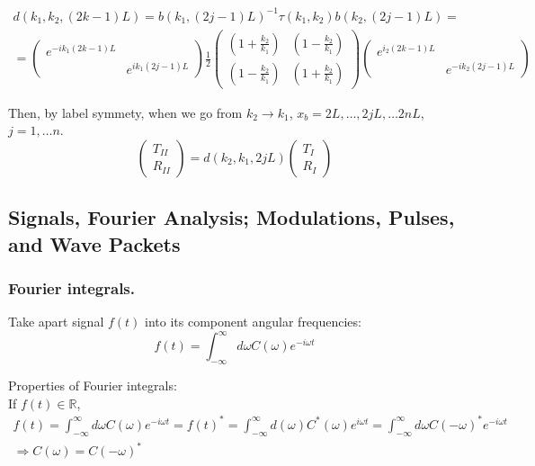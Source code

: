 \documentclass[twoside, 10pt]{amsart}
\begin{document}
\[
\begin{gathered}
  d(k_1,k_2,(2k-1)L) = b(k_1,(2j-1)L)^{-1} \tau(k_1,k_2) b(k_2,(2j-1)L ) = \\
  = \left( \begin{matrix} e^{-ik_1 (2k-1) L } & \\ & e^{ik_1(2j-1) L } \end{matrix} \right) \frac{1}{2} \left( \begin{matrix} \left( 1 + \frac{k_2}{k_1} \right) & \left( 1 - \frac{k_2}{k_1} \right) \\ \left( 1 - \frac{k_2}{k_1} \right) & \left( 1 + \frac{k_2}{k_1} \right) \end{matrix} \right) \left( \begin{matrix} e^{i_2 ( 2k-1) L } & \\ & e^{-ik_2(2j-1) L } \end{matrix} \right)
\end{gathered}
\]

Then, by label symmety, when we go from $k_2 \to k_1$, $x_b = 2L, \dots, 2jL, \dots 2nL$, $j=1,\dots n$.  
\[
\left( \begin{matrix} T_{II} \\ R_{II} \end{matrix} \right)  = d(k_2,k_1, 2jL ) \left( \begin{matrix} T_I \\ R_I \end{matrix} \right)
\]



\subsection{Signals, Fourier Analysis; Modulations, Pulses, and Wave Packets }

\subsubsection{Fourier integrals.}  

Take apart signal $f(t)$ into its component angular frequencies:
\[
f(t) = \int_{-\infty}^{\infty} d\omega C(\omega) e^{-i \omega t}
\]

Properties of Fourier integrals: \medskip \\
If $f(t) \in \mathbb{R}$, 
\[
\begin{gathered}
  f(t) = \int_{-\infty}^{\infty} d\omega C(\omega) e^{-i\omega t} = f(t)^* = \int_{-\infty}^{\infty} d(\omega) C^*(\omega) e^{i\omega t} = \int_{-\infty}^{\infty} d\omega C(-\omega)^* e^{-i\omega t} \\
  \Longrightarrow C(\omega) = C(-\omega)^*
\end{gathered}
\]
\end{document}
